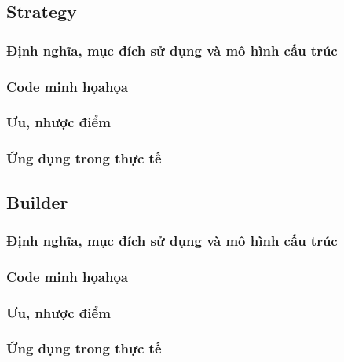 \documentclass[14pt]{article}
\begin{document}
\subsection{Strategy}
\subsubsection{ Định nghĩa, mục đích sử dụng và mô hình cấu trúc}
\subsubsection{ Code minh họahọa}
\subsubsection{ Ưu, nhược điểm}
\subsubsection{ Ứng dụng trong thực tế}

\subsection{Builder}
\subsubsection{ Định nghĩa, mục đích sử dụng và mô hình cấu trúc}
\subsubsection{ Code minh họahọa}
\subsubsection{ Ưu, nhược điểm}
\subsubsection{ Ứng dụng trong thực tế}
\end{document}

